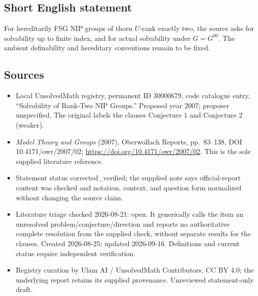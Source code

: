 \documentclass[11pt]{article}
\begin{document}
\subsection{Short English statement}
For hereditarily FSG NIP groups of thorn $U$-rank exactly two, the source asks for solvability up to finite index, and for actual solvability under $G=G^{00}$. The ambient definability and hereditary conventions remain to be fixed.
\subsection{Sources}
\begin{itemize}
\item Local UnsolvedMath registry, permanent ID 30000679, code catalogue entry, ``Solvability of Rank-Two NIP Groups.'' Proposed year 2007; proposer unspecified. The original labels the clauses Conjecture 1 and Conjecture 2 (weaker).
\item \emph{Model Theory and Groups} (2007), Oberwolfach Reports, pp.\ 83--138, DOI 10.4171/owr/2007/02; \url{https://doi.org/10.4171/owr/2007/02}. This is the sole supplied literature reference.
\item Statement status corrected\_verified; the supplied note says official-report content was checked and notation, context, and question form normalized without changing the source claim.
\item Literature triage checked 2026-08-21: open. It generically calls the item an unresolved problem/conjecture/direction and reports no authoritative complete resolution from the supplied check, without separate results for the clauses. Created 2026-08-25; updated 2026-09-16. Definitions and current status require independent verification.
\item Registry curation by Ulam AI / UnsolvedMath Contributors, CC BY 4.0; the underlying report retains its supplied provenance. Unreviewed statement-only draft.
\end{itemize}
\end{document}

